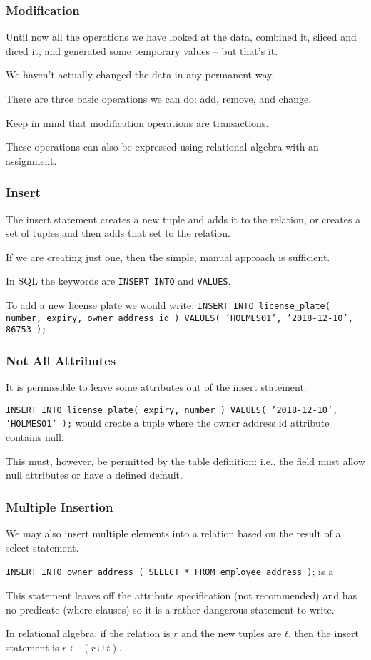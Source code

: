 \begin{frame}
\frametitle{Modification}

Until now all the operations we have looked at the data, combined it, sliced and diced it, and generated some temporary values -- but that's it. 

We haven't actually changed the data in any permanent way. 

There are three basic operations we can do: add, remove, and change.

Keep in mind that modification operations are transactions. 

These operations can also be expressed using relational algebra with an assignment. 

\end{frame}



\begin{frame}
\frametitle{Insert}

The insert statement creates a new tuple and adds it to the relation, or creates a set of tuples and then adds that set to the relation.

If we are creating just one, then the simple, manual approach is sufficient. 

In SQL the keywords are \texttt{INSERT INTO} and \texttt{VALUES}. 

To add a new license plate we would write: \texttt{INSERT INTO license\_plate( number, expiry, owner\_address\_id ) VALUES( 'HOLMES01', '2018-12-10', 86753 );} 

\end{frame}



\begin{frame}
\frametitle{Not All Attributes}

It is permissible to leave some attributes out of the insert statement. 

\texttt{INSERT INTO license\_plate( expiry, number ) VALUES( '2018-12-10', 'HOLMES01' );} would create a tuple where the owner address id attribute contains null. 

This must, however, be permitted by the table definition: i.e., the field must allow null attributes or have a defined default.


\end{frame}



\begin{frame}
\frametitle{Multiple Insertion}


We may also insert multiple elements into a relation based on the result of a select statement. 

\texttt{INSERT INTO owner\_address ( SELECT * FROM employee\_address )}; is a 

This statement leaves off the attribute specification (not recommended) and has no predicate (where clauses) so it is a rather dangerous statement to write.

In relational algebra, if the relation is $r$ and the new tuples are $t$, then the insert statement is $r \leftarrow (r \cup t)$.


\end{frame}


